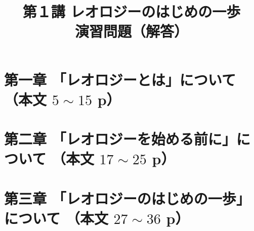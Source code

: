 \documentclass[uplatex,dvipdfmx,a4paper,11pt]{jsreport}
\title{第１講 レオロジーのはじめの一歩\\演習問題（解答）}
\author{}
\date{}
\begin{document}
\maketitle

\section*{第一章 「レオロジーとは」について （本文 $5\sim15$ p）}

\clearpage
\section*{第二章 「レオロジーを始める前に」について （本文 $17\sim25$ p）}

\clearpage
\section*{第三章 「レオロジーのはじめの一歩」について （本文 $27\sim36$ p）}

\clearpage
\end{document}
